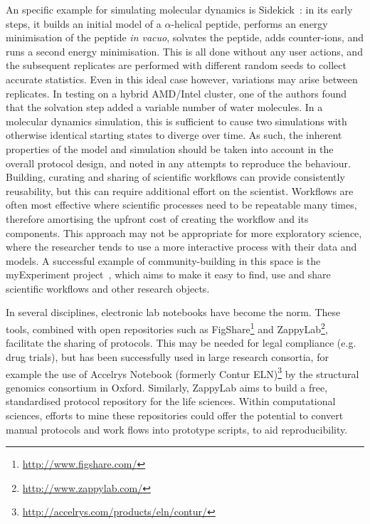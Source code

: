 \documentclass[conference]{IEEEtran}
\begin{document}
An specific example for simulating molecular dynamics is
Sidekick~\cite{Hall2014Sidekick}: in its early steps, it builds an
initial model of a $\alpha$-helical peptide, performs an energy
minimisation of the peptide \emph{in vacuo}, solvates the peptide,
adds counter-ions, and runs a second energy minimisation. This is all
done without any user actions, and the subsequent replicates are
performed with different random seeds to collect accurate
statistics. Even in this ideal case however, variations may arise
between replicates. In testing on a hybrid AMD/Intel cluster, one of
the authors found that the solvation step added a variable number of
water molecules. In a molecular dynamics simulation, this is
sufficient to cause two simulations with otherwise identical starting
states to diverge over time. As such, the inherent properties of the
model and simulation should be taken into account in the overall
protocol design, and noted in any attempts to reproduce the
behaviour. Building, curating and sharing of scientific workflows can
provide consistently reusability, but this can require additional
effort on the scientist.  Workflows are often most effective where
scientific processes need to be repeatable many times, therefore
amortising the upfront cost of creating the workflow and its
components. This approach may not be appropriate for more exploratory
science, where the researcher tends to use a more interactive process
with their data and models. A successful example of community-building
in this space is the myExperiment project~\cite{myexperiment:2009},
which aims to make it easy to find, use and share scientific workflows
and other research objects.

In several disciplines, electronic lab notebooks have become the
norm. These tools, combined with open repositories such as
FigShare\footnote{\url{http://www.figshare.com/}} and
ZappyLab\footnote{\url{http://www.zappylab.com/}}, facilitate the
sharing of protocols. This may be needed for legal compliance
(e.g. drug trials), but has been successfully used in large research
consortia, for example the use of Accelrys Notebook (formerly Contur
ELN)\footnote{\url{http://accelrys.com/products/eln/contur/}} by the
structural genomics consortium in Oxford. Similarly, ZappyLab aims to
build a free, standardised protocol repository for the life
sciences. Within computational sciences, efforts to mine these
repositories could offer the potential to convert manual protocols and
work flows into prototype scripts, to aid reproducibility.
\end{document}
